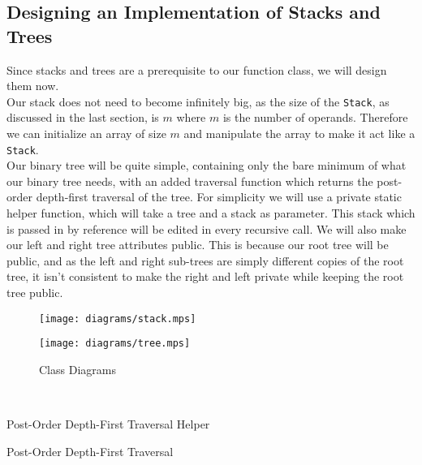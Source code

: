 \documentclass[../../../../../main.tex]{subfiles}
\begin{document}
\subsection{Designing an Implementation of Stacks and Trees}
Since stacks and trees are a prerequisite to our function class, we will design them now.\\
Our stack does not need to become infinitely big, as the size of the \texttt{Stack}, as discussed in the last section, is $m$ where $m$ is the number of operands. Therefore we can initialize an array of size $m$ and manipulate the array to make it act like a \texttt{Stack}.\\
Our binary tree will be quite simple, containing only the bare minimum of what our binary tree needs, with an added traversal function which returns the post-order depth-first traversal of the tree. For simplicity we will use a private static helper function, which will take a tree and a stack as parameter. This stack which is passed in by reference will be edited in every recursive call. We will also make our left and right tree attributes public. This is because our root tree will be public, and as the left and right sub-trees are simply different copies of the root tree, it isn't consistent to make the right and left private while keeping the root tree public.\\
\begin{figure}[h]
\centering
\begin{minipage}{.5\textwidth}
  \centering
  \texttt{[image: diagrams/stack.mps]}
\end{minipage}%
\begin{minipage}{.5\textwidth}
  \centering
  \texttt{[image: diagrams/tree.mps]}
\end{minipage}

\caption{Class Diagrams}
\end{figure}
\\
\begin{algorithm}
\caption{Post-Order Depth-First Traversal Helper}
\label{alg:traverseHelper}
\DontPrintSemicolon
{}
\end{algorithm}
\begin{algorithm}
\caption{Post-Order Depth-First Traversal}
\label{alg:traverse}
\DontPrintSemicolon
{}
\end{algorithm}

\newpage
\end{document}
